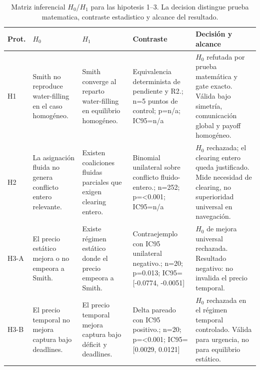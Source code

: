 \begin{table}[H]
\centering
\caption{Matriz inferencial $H_0$/$H_1$ para las hipotesis 1--3. La decision distingue prueba matematica, contraste estadistico y alcance del resultado.}
\label{tab:hypothesis-decision-base-a}
\scriptsize
\begin{tabularx}{\textwidth}{@{}>{\raggedright\arraybackslash}p{}>{\raggedright\arraybackslash}p{}>{\raggedright\arraybackslash}p{}>{\raggedright\arraybackslash}p{}>{\raggedright\arraybackslash}X@{}}
\toprule
Prot. & $H_0$ & $H_1$ & Contraste & Decisión y alcance \\
\midrule
H1 & Smith no reproduce water-filling en el caso homogéneo. & Smith converge al reparto water-filling en equilibrio homogéneo. & Equivalencia determinista de pendiente y R2.; n=5 puntos de control; p=n/a; IC95=n/a & $H_0$ refutada por prueba matemática y gate exacto. Válida bajo simetría, comunicación global y payoff homogéneo. \\
H2 & La asignación fluida no genera conflicto entero relevante. & Existen coaliciones fluidas parciales que exigen clearing entero. & Binomial unilateral sobre conflicto fluido-entero.; n=252; p=\textless{}0.001; IC95=n/a & $H_0$ rechazada; el clearing entero queda justificado. Mide necesidad de clearing, no superioridad universal en navegación. \\
H3-A & El precio estático mejora o no empeora a Smith. & Existe régimen estático donde el precio empeora a Smith. & Contraejemplo con IC95 unilateral negativo.; n=20; p=0.013; IC95=[-0.0774, -0.0051] & $H_0$ de mejora universal rechazada. Resultado negativo: no invalida el precio temporal. \\
H3-B & El precio temporal no mejora captura bajo deadlines. & El precio temporal mejora captura bajo déficit y deadlines. & Delta pareado con IC95 positivo.; n=20; p=\textless{}0.001; IC95=[0.0029, 0.0121] & $H_0$ rechazada en el régimen temporal controlado. Válida para urgencia, no para equilibrio estático. \\
\bottomrule
\end{tabularx}
\end{table}

